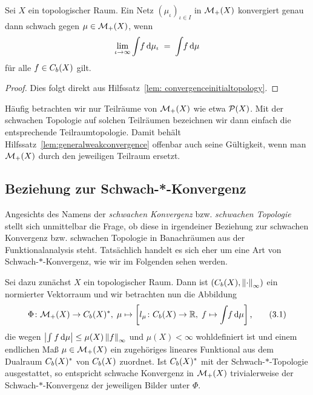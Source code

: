 \documentclass[../main/main.tex]{subfiles}
\begin{document}
	\begin{Hilfssatz}
		\label{lem:generalweakconvergence}
		Sei $X$ ein topologischer Raum. Ein Netz $(\mu_\iota)_{\iota \in I}$ in $\mathcal{M}_{+}(X)$ konvergiert genau dann schwach gegen $\mu \in \mathcal{M}_{+}(X)$, wenn
		\[ \lim_{\iota \to \infty} \int_{} \, f \, \mathrm{d}\mu_\iota \; = \; \int_{} \, f \, \mathrm{d}\mu \]
		für alle $f \in C_b(X)$ gilt.
	\end{Hilfssatz}

	\begin{proof}
		Dies folgt direkt aus Hilfssatz~\ref{lem: convergenceinitialtopology}.
	\end{proof}

	\begin{Bemerkung}
		Häufig betrachten wir nur Teilräume von $\mathcal{M}_{+}(X)$ wie etwa $\mathcal{P}(X)$. Mit der schwachen Topologie auf solchen Teilräumen bezeichnen wir 
		dann einfach die entsprechende Teilraumtopologie. Damit behält Hilfssatz~\ref{lem:generalweakconvergence} offenbar auch seine Gültigkeit, wenn man $\mathcal{M}_{+}(X)$ durch den 
		jeweiligen Teilraum ersetzt.
	\end{Bemerkung}

	\subsection{Beziehung zur Schwach-*-Konvergenz}
	\label{subsec:BeziehungSchwachStern}
	
	Angesichts des Namens der \emph{schwachen Konvergenz} bzw. \emph{schwachen Topologie} stellt sich unmittelbar die Frage, ob diese in irgendeiner Beziehung zur schwachen Konvergenz bzw. schwachen Topologie in Banachräumen aus der 
	Funktionalanalysis steht. Tatsächlich handelt es sich eher um eine Art von Schwach-$\ast$-Konvergenz, wie wir im Folgenden sehen werden. 
	
	Sei dazu zunächst $X$ ein topologischer Raum. Dann ist $(C_b(X), \left\lVert\cdot\right\rVert_\infty)$ ein normierter Vektorraum und wir betrachten nun die Abbildung
	\[\Phi \colon \mathcal{M}_{+}(X) \to C_b(X)^\ast, \; \mu \mapsto \left[l_\mu \colon C_b(X) \to \mathbb{R}, \; f \mapsto \int_{} \, f \, \mathrm{d}\mu \right]  \text{,} \label{3.1} \tag{3.1}\]
	die wegen $\left| \int_{} \, f \, \mathrm{d}\mu \right| \leq \mu(X) \left\lVert f\right\rVert_\infty$ und $\mu(X) < \infty$ wohldefiniert ist 
	und einem endlichen Maß $\mu \in \mathcal{M}_{+}(X)$ ein zugehöriges lineares Funktional aus dem Dualraum $C_b(X)^\ast$ von $C_b(X)$ zuordnet. 
	Ist $C_b(X)^\ast$ mit der 
	Schwach-$\ast$-Topologie ausgestattet, so entspricht schwache Konvergenz in $\mathcal{M}_{+}(X)$ trivialerweise der 
	Schwach-$\ast$-Konvergenz der jeweiligen Bilder unter $\Phi$.
	
\end{document}
